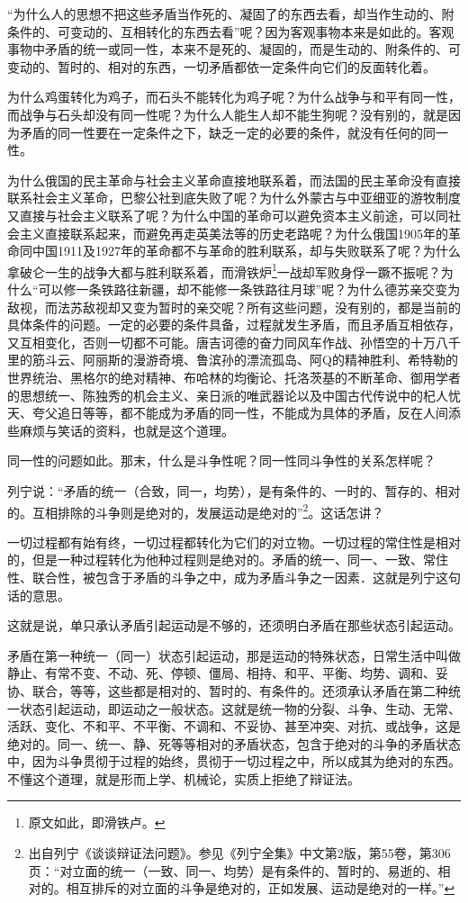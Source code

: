 \documentclass[UTF8, 12pt, a4paper]{ctexrep}
\begin{document}
“为什么人的思想不把这些矛盾当作死的、凝固了的东西去看，却当作生动的、附条件的、可变动的、互相转化的东西去看”呢？因为客观事物本来是如此的。客观事物中矛盾的统一或同一性，本来不是死的、凝固的，而是生动的、附条件的、可变动的、暂时的、相对的东西，一切矛盾都依一定条件向它们的反面转化着。

为什么鸡蛋转化为鸡子，而石头不能转化为鸡子呢？为什么战争与和平有同一性，而战争与石头却没有同一性呢？为什么人能生人却不能生狗呢？没有别的，就是因为矛盾的同一性要在一定条件之下，缺乏一定的必要的条件，就没有任何的同一性。

为什么俄国的民主革命与社会主义革命直接地联系着，而法国的民主革命没有直接联系社会主义革命，巴黎公社到底失败了呢？为什么外蒙古与中亚细亚的游牧制度又直接与社会主义联系了呢？为什么中国的革命可以避免资本主义前途，可以同社会主义直接联系起来，而避免再走英美法等的历史老路呢？为什么俄国1905年的革命同中国1911及1927年的革命都不与革命的胜利联系，却与失败联系了呢？为什么拿破仑一生的战争大都与胜利联系着，而滑铁炉\footnote{原文如此，即滑铁卢。}一战却军败身俘一蹶不振呢？为什么“可以修一条铁路往新疆，却不能修一条铁路往月球”呢？为什么德苏亲交变为敌视，而法苏敌视却又变为暂时的亲交呢？所有这些问题，没有别的，都是当前的具体条件的问题。一定的必要的条件具备，过程就发生矛盾，而且矛盾互相依存，又互相变化，否则一切都不可能。唐吉诃德的奋力同风车作战、孙悟空的十万八千里的筋斗云、阿丽斯的漫游奇境、鲁滨孙的漂流孤岛、阿Q的精神胜利、希特勒的世界统治、黑格尔的绝对精神、布哈林的均衡论、托洛茨基的不断革命、御用学者的思想统一、陈独秀的机会主义、亲日派的唯武器论以及中国古代传说中的杞人忧天、夸父追日等等，都不能成为矛盾的同一性，不能成为具体的矛盾，反在人间添些麻烦与笑话的资料，也就是这个道理。

同一性的问题如此。那末，什么是斗争性呢？同一性同斗争性的关系怎样呢？

列宁说：“矛盾的统一（合致，同一，均势），是有条件的、一时的、暂存的、相对的。互相排除的斗争则是绝对的，发展运动是绝对的”\footnote{出自列宁《谈谈辩证法问题》。参见《列宁全集》中文第2版，第55卷，第306页：“对立面的统一（一致、同一、均势）是有条件的、暂时的、易逝的、相对的。相互排斥的对立面的斗争是绝对的，正如发展、运动是绝对的一样。”}。这话怎讲？

一切过程都有始有终，一切过程都转化为它们的对立物。一切过程的常住性是相对的，但是一种过程转化为他种过程则是绝对的。矛盾的统一、同一、一致、常住性、联合性，被包含于矛盾的斗争之中，成为矛盾斗争之一因素．这就是列宁这句话的意思。

这就是说，单只承认矛盾引起运动是不够的，还须明白矛盾在那些状态引起运动。

矛盾在第一种统一（同一）状态引起运动，那是运动的特殊状态，日常生活中叫做静止、有常不变、不动、死、停顿、僵局、相持、和平、平衡、均势、调和、妥协、联合，等等，这些都是相对的、暂时的、有条件的。还须承认矛盾在第二种统一状态引起运动，即运动之一般状态。这就是统一物的分裂、斗争、生动、无常、活跃、变化、不和平、不平衡、不调和、不妥协、甚至冲突、对抗、或战争，这是绝对的。同一、统一、静、死等等相对的矛盾状态，包含于绝对的斗争的矛盾状态中，因为斗争贯彻于过程的始终，贯彻于一切过程之中，所以成其为绝对的东西。不懂这个道理，就是形而上学、机械论，实质上拒绝了辩证法。
\end{document}
